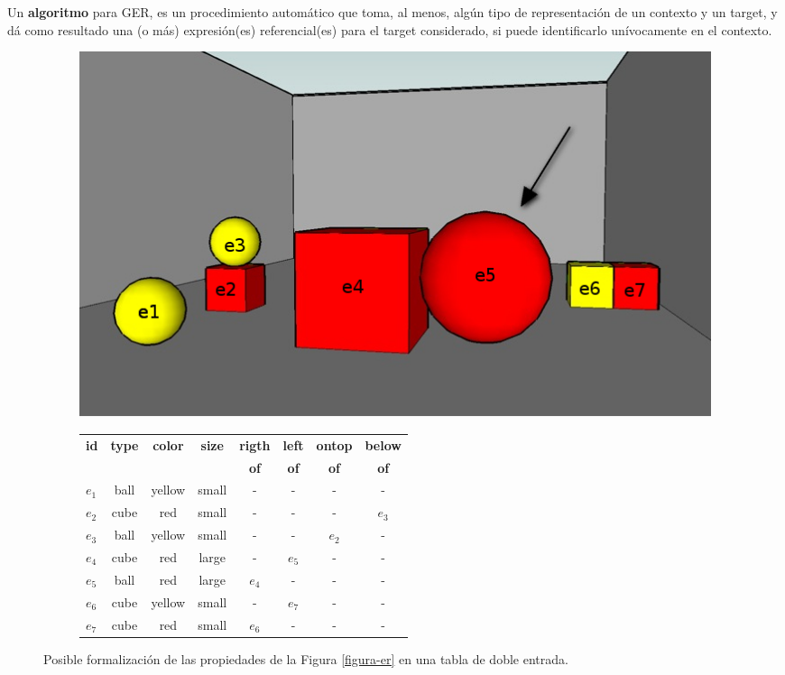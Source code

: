 Un {\bf algoritmo} para GER, es un procedimiento autom\'atico que toma, al menos, alg\'un tipo de representaci\'on de un contexto y un target, y d\'a como resultado una (o m\'as) expresi\'on(es) referencial(es) para el target considerado, si puede identificarlo un\'ivocamente en el contexto.

\begin{figure}[H]
\begin{subfigure}{.4\textwidth}
  \centering
	\vspace*{-.2cm}
\includegraphics[width=\textwidth]{images/22.jpg}
  \caption{}\label{GRE3D7-stimulus1-ids}
\end{subfigure}
\begin{subfigure}{1\textwidth}
 \centering
\begin{centering}
\hspace*{-8cm}
\begin{scriptsize}
\begin{tabular}{|l|c|c|c|c|c|c|c|}

\hline
\textbf {id}& 	\textbf {type}		&	\textbf {color}	&	\textbf {size}& \textbf {rigth} & \textbf {left} & \textbf {ontop}	& \textbf {below}	\\
   	   &  	    			&	    		&	     		&  \textbf {of}   		 &  \textbf {of}	    &  \textbf {of}	&  \textbf {of}\\
\hline \hline
$e_1$ & ball & yellow & small & - & - & - & - \\
$e_2$ & cube & red & small & - & - &- & $e_3$ \\
$e_3$ & ball & yellow & small & - & - & $e_2$ & -\\
$e_4$ & cube & red & large & - & $e_5$ & - & -\\
$e_5$ & ball & red & large & $e_4$ & - & - & -\\
$e_6$ & cube & yellow & small & - & $e_7$ & - & -\\
$e_7$ & cube & red & small & $e_6$ & - & - & -\\
\hline
\end{tabular}
\end{scriptsize}

\caption{}\label{tabla-propiedades}
\end{centering}
\end{subfigure}
\caption{Posible formalizaci\'on de las propiedades de la Figura \ref{figura-er} en una tabla de doble entrada.}\label{contexto-tabla-propiedades}
\end{figure}


